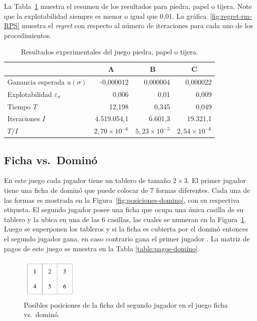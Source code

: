 La Tabla~\ref{table:resultados-rm-RPS} muestra el resumen de los resultados para piedra, papel o tijera. Note que la explotabilidad siempre es menor o igual que 0,01. La gráfica~\ref{fig:regret-rm-RPS} muestra el \textit{regret} con respecto al número de iteraciones para cada uno de los procedimientos.

\begin{table}[t]
\caption{Resultados experimentales del juego piedra, papel o tijera.}
\label{table:resultados-rm-RPS}
\centering
\begin{tabular}{l r r r}
    \toprule
    & \multicolumn{1}{c}{A} & \multicolumn{1}{c}{B} & \multicolumn{1}{c}{C} \\ \midrule
    Ganancia esperada $u(\sigma)$         & -0,000012 & 0,000004 & 0,000022 \\
    Explotabilidad $\varepsilon_{\sigma}$ &  0,006 & 0,01 & 0,009 \\
    Tiempo $T$                            & 12,198 & 0,345 & 0,049 \\
    Iteraciones $I$                       & 4.519.054,1 & 6.601,3 &  19.321,1 \\
    $T/I$                                 & $2,70{\times}10^{-6}$ & $5,23{\times}10^{-5}$ & $2,54{\times}10^{-6}$\\
    \bottomrule
\end{tabular}
\end{table}

\subsection*{Ficha vs.\ Dominó}

En este juego cada jugador tiene un tablero de tamaño $2\times 3$. El primer jugador tiene una ficha de dominó que puede colocar de $7$ formas diferentes. Cada una de las formas es mostrada en la Figura~\ref{fig:posiciones-domino}, con su respectiva etiqueta. El segundo jugador posee una ficha que ocupa una única casilla de su tablero y la ubica en una de las $6$ casillas, las cuales se numeran en la Figura~\ref{fig:posiciones}. Luego se superponen los tableros y si la ficha es cubierta por el dominó entonces el segundo jugador gana, en caso contrario gana el primer jugador \cite[p. 237]{bib:pl-chvatal}. La matriz de pagos de este juego se muestra en la Tabla \ref{table:pagos-domino}.

\begin{figure}[t]
\centering
\includegraphics[width=0.25\textwidth]{figuras/posiciones.png}
\caption{Posibles posiciones de la ficha del segundo jugador en el juego ficha vs.\ dominó.}
\label{fig:posiciones}
\end{figure}

